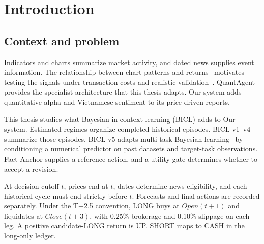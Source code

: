 \chapter{Introduction}\label{s:c4e0e5d02a165aa6}
\section{Context and problem}\label{s:f46b1bbcce72991b}
Indicators and charts summarize market activity, and dated news supplies
event information. The relationship between chart patterns and
returns~\cite{lo2000technical} motivates testing the signals under
transaction costs and realistic validation~\cite{arnott2019backtesting}.
QuantAgent~\cite{xiong2025quantagent} provides the specialist architecture
that this thesis adapts. Our system adds quantitative alpha and Vietnamese
sentiment to its price-driven reports.

This thesis studies what Bayesian in-context learning (BICL) adds to Our
system. Estimated regimes organize completed historical episodes. BICL
v1--v4 summarize those episodes. BICL v5 adapts multi-task Bayesian
learning~\cite{zhu2026multitask} by conditioning a numerical predictor on
past datasets and target-task observations. Fact Anchor supplies a
reference action, and a utility gate determines whether to accept a revision.

At decision cutoff $t$, prices end at $t$, dates determine news eligibility,
and each historical cycle must end strictly before $t$. Forecasts and
final actions are recorded separately. Under the T+2.5 convention, LONG
buys at $Open(t+1)$ and liquidates at $Close(t+3)$, with 0.25\% brokerage and 0.10\% slippage on
each leg. A positive candidate-LONG return is UP. SHORT maps to CASH
in the long-only ledger.

